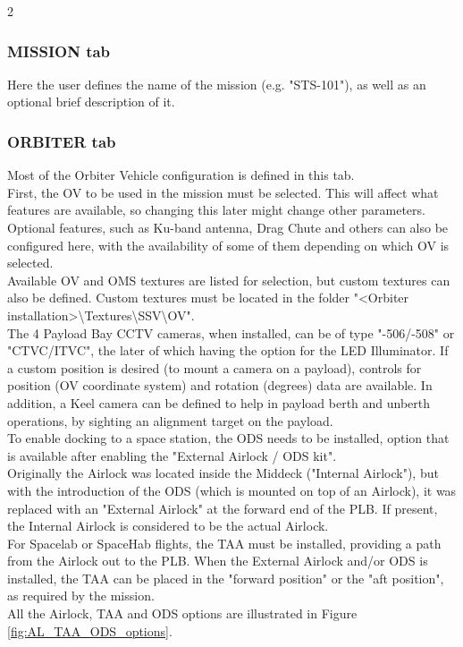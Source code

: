 \documentclass[Space_Shuttle_Vessel_Manual.tex]{subfiles}
\begin{document}
\begin{multicols*}{2}
\subsubsection{MISSION tab}
Here the user defines the name of the mission (e.g. "STS-101"), as well as an optional brief description of it.


\subsubsection{ORBITER tab}
Most of the Orbiter Vehicle configuration is defined in this tab.\\
First, the OV to be used in the mission must be selected. This will affect what features are available, so changing this later might change other parameters.\\
Optional features, such as Ku-band antenna, Drag Chute and others can also be configured here, with the availability of some of them depending on which OV is selected.\\
Available OV and OMS textures are listed for selection, but custom textures can also be defined. Custom textures must be located in the folder "<Orbiter installation>\textbackslash Textures\textbackslash SSV\textbackslash OV".\\
The 4 Payload Bay CCTV cameras, when installed, can be of type "-506/-508" or "CTVC/ITVC", the later of which having the option for the LED Illuminator. If a custom position is desired (to mount a camera on a payload), controls for position (OV coordinate system) and rotation (degrees) data are available. In addition, a Keel camera can be defined to help in payload berth and unberth operations, by sighting an alignment target on the payload.\\
To enable docking to a space station, the ODS needs to be installed, option that is available after enabling the "External Airlock / ODS kit".\\
Originally the Airlock was located inside the Middeck ("Internal Airlock"), but with the introduction of the ODS (which is mounted on top of an Airlock), it was replaced with an "External Airlock" at the forward end of the PLB. If present, the Internal Airlock is considered to be the actual Airlock.\\
For Spacelab or SpaceHab flights, the TAA must be installed, providing a path from the Airlock out to the PLB. When the External Airlock and/or ODS is installed, the TAA can be placed in the "forward position" or the "aft position", as required by the mission.\\
All the Airlock, TAA and ODS options are illustrated in Figure \ref{fig:AL_TAA_ODS_options}.


\end{multicols*}
\end{document}
